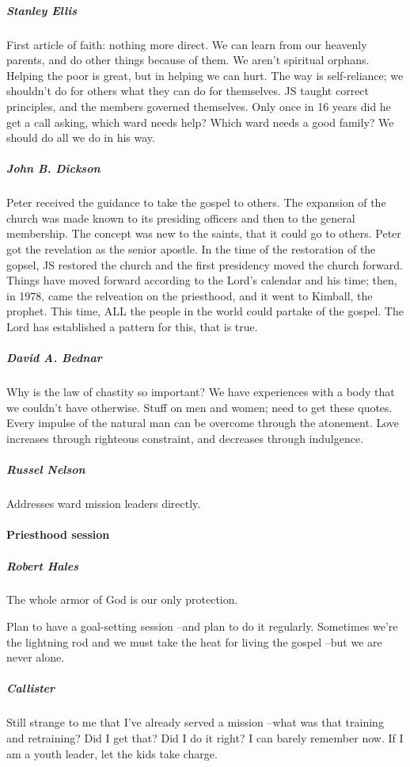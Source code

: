 \subparagraph*{Stanley Ellis} First article of faith: nothing more direct. We can learn from our heavenly parents, and do other things because of them. We aren't spiritual orphans. Helping the poor is great, but in helping we can hurt. The way is self-reliance; we shouldn't do for others what they can do for themselves. JS taught correct principles, and the members governed themselves. Only once in 16 years did he get a call asking, which ward needs help? Which ward needs a good family? We should do all we do in his way.

\subparagraph*{John B. Dickson} Peter received the guidance to take the gospel to others. The expansion of the church was made known to its presiding officers and then to the general membership. The concept was new to the saints, that it could go to others. Peter got the revelation as the senior apostle. In the time of the restoration of the gopsel, JS restored the church and the first presidency moved the church forward. Things have moved forward according to the Lord's calendar and his time; then, in 1978, came the relveation on the priesthood, and it went to Kimball, the prophet. This time, ALL the people in the world could partake of the gospel. The Lord has established a pattern for this, that is true.

\subparagraph*{David A. Bednar} Why is the law of chastity so important? We have experiences with a body that we couldn't have otherwise. Stuff on men and women; need to get these quotes. Every impulse of the natural man can be overcome through the atonement. Love increases through righteous constraint, and decreases through indulgence.

\subparagraph*{Russel Nelson} Addresses ward mission leaders directly.

\paragraph*{Priesthood session}

\subparagraph*{Robert Hales} The whole armor of God is our only protection.

Plan to have a goal-setting session --and plan to do it regularly. Sometimes we're the lightning rod and we must take the heat for living the gospel --but we are never alone.

\subparagraph*{Callister} Still strange to me that I've already served a mission --what was that training and retraining? Did I get that? Did I do it right? I can barely remember now. If I am a youth leader, let the kids take charge.


